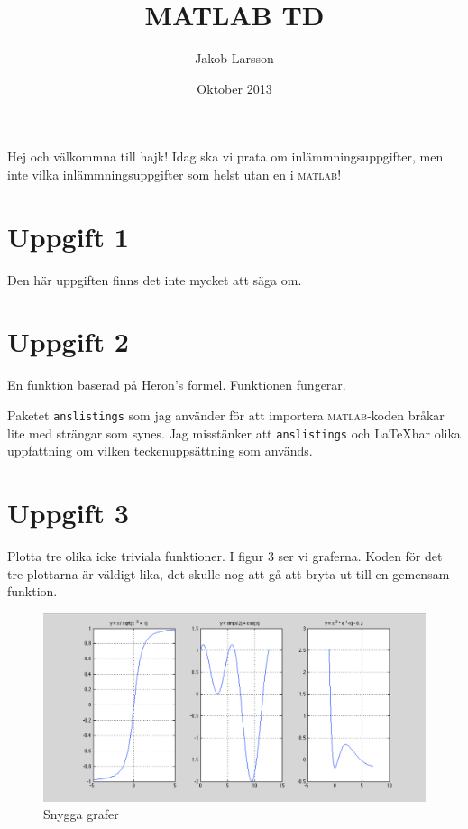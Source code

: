 \documentclass[a4paper,11pt]{article}
\begin{document}
    \title{\textsc{MATLAB} TD}
    \author{Jakob Larsson}
    \date{Oktober 2013}
    \maketitle{}

    Hej och välkommna till hajk! Idag ska vi prata om inlämmningsuppgifter,
    men inte vilka inlämmningsuppgifter som helst utan en i \textsc{matlab}!

    \section*{Uppgift 1}
    Den här uppgiften finns det inte mycket att säga om.
    \begin{samepage}
    \end{samepage}

    \pagebreak[2]
    \section*{Uppgift 2}
    En funktion baserad  på Heron's formel.
    Funktionen fungerar.

    Paketet \verb+anslistings+ som jag använder för att importera
    \textsc{matlab}-koden
    bråkar lite med strängar som synes. Jag misstänker att \verb+anslistings+
    och \LaTeX har olika uppfattning om vilken teckenuppsättning som används.
    \begin{samepage}
    \end{samepage}

    \section*{Uppgift 3}
    Plotta tre olika icke triviala funktioner. I figur 3 ser vi graferna.
    Koden för det tre plottarna är väldigt lika, det skulle nog att gå att bryta
    ut till en gemensam funktion.
    \begin{samepage}
    \end{samepage}
    \begin{figure}
        \includegraphics[width=\textwidth]{ex3.png}
        \caption{Snygga grafer}
    \end{figure}
\end{document}
